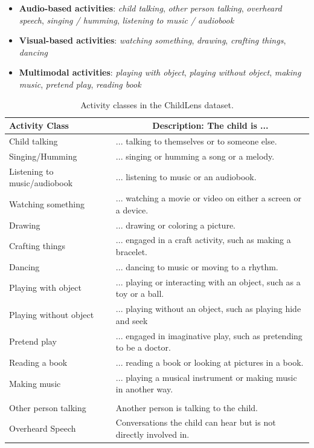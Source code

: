 \documentclass[
  man,floatsintext]{apa6}
\providecommand{\tightlist}{%
  \setlength{\itemsep}{0pt}\setlength{\parskip}{0pt}}
\begin{document}
\begin{itemize}
\tightlist
\item
  \textbf{Audio-based activities}: \emph{child talking}, \emph{other person talking}, \emph{overheard speech}, \emph{singing / humming}, \emph{listening to music / audiobook}
\item
  \textbf{Visual-based activities}: \emph{watching something}, \emph{drawing}, \emph{crafting things}, \emph{dancing}
\item
  \textbf{Multimodal activities}: \emph{playing with object}, \emph{playing without object}, \emph{making music}, \emph{pretend play}, \emph{reading book}
\end{itemize}

\begin{table}[tbp]

\begin{center}
\begin{threeparttable}

\caption{\label{tab:activity-classes-description}Activity classes in the ChildLens dataset.}

\begin{tabular}{ll}
\toprule
Activity Class & \multicolumn{1}{c}{Description: The child is ...}\\
\midrule
Child talking & ... talking to themselves or to someone else.\\
Singing/Humming & ... singing or humming a song or a melody.\\
Listening to music/audiobook & ... listening to music or an audiobook.\\
Watching something & ... watching a movie or video on either a screen or a device.\\
Drawing & ... drawing or coloring a picture.\\
Crafting things & ... engaged in a craft activity, such as making a bracelet.\\
Dancing & ... dancing to music or moving to a rhythm.\\
Playing with object & ... playing or interacting with an object, such as a toy or a ball.\\
Playing without object & ... playing without an object, such as playing hide and seek\\
Pretend play & ... engaged in imaginative play, such as pretending to be a doctor.\\
Reading a book & ... reading a book or looking at pictures in a book.\\
Making music & ... playing a musical instrument or making music in another way.\\
 & \\
Other person talking & Another person is talking to the child.\\
Overheard Speech & Conversations the child can hear but is not directly involved in.\\
\bottomrule
\end{tabular}

\end{threeparttable}
\end{center}

\end{table}
\end{document}
